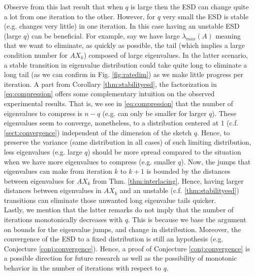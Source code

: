 \documentclass[12pt,conference,compsocconf]{IEEEtran}
\begin{document}
Observe from this last result that when $q$ is large then the ESD can change quite a lot from one iteration to the other. However, for $q$ very small the ESD is stable (e.g. changes very little) in one iteration. In this case having an unstable ESD (large $q$) can be beneficial. For example, say we have large $\lambda_{max}(A)$ meaning that we want to eliminate, as quickly as possible, the tail (which implies a large condition number for $AX_k$) composed of large eigenvalues. In the latter scenario, a stable transition in eigenvalue distribution could take quite long to eliminate a long tail (as we can confirm in Fig. \ref{fig:ratedim}) as we make little progress per iteration. A part from Corollary \ref{thm:stabilityesd}, the factorization in \ref{eq:compression} offers some complementary intuition on the observed experimental results. That is, we see in \ref{eq:compression} that the number of eigenvalues to compress is $n-q$ (e.g. can only be smaller for larger $q$). These eigenvalues seem to converge, nonetheless, to a distribution centered at $1$ (c.f. \ref{sect:convergence}) independent of the dimension of the sketch $q$. Hence, to preserve the variance (same distribution in all cases) of such limiting distribution, less eigenvalues (e.g. large $q$) should be more spread compared to the situation when we have more eigenvalues to compress (e.g. smaller $q$). Now, the jumps that eigenvalues can make from iteration $k$ to $k+1$ is bounded by the distances between eigenvalues for $AX_k$ from Thm. \ref{thm:interlacing}. Hence, having larger distances between eigenvalues in $AX_k$ and an unstable (c.f. \ref{thm:stabilityesd}) transitions can eliminate those unwanted long eigenvalue tails quicker.\\
Lastly, we mention that the latter remarks do not imply that the number of iterations monotonically decreases with $q$. This is because we base the argument on bounds for the eigenvalue jumps, and change in distribution. Moreover, the convergence of the ESD to a fixed distribution is still an hypothesis (e.g. Conjecture \ref{conj:convergence}). Hence, a proof of Conjecture \ref{conj:convergence} is a possible direction for future research as well as the possibility of monotonic behavior in the number of iterations with respect to $q$.
\end{document}
